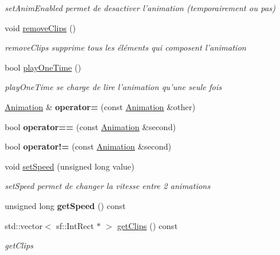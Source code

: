\begin{DoxyCompactItemize}
\begin{DoxyCompactList}\small\item\em set\+Anim\+Enabled permet de desactiver l'animation (temporairement ou pas) \end{DoxyCompactList}\item 
\hypertarget{class_animation_ab9b96707a3a9d6d37a08f6c3a3b6672b}{void \hyperlink{class_animation_ab9b96707a3a9d6d37a08f6c3a3b6672b}{remove\+Clips} ()}\label{class_animation_ab9b96707a3a9d6d37a08f6c3a3b6672b}

\begin{DoxyCompactList}\small\item\em remove\+Clips supprime tous les éléments qui composent l'animation \end{DoxyCompactList}\item 
bool \hyperlink{class_animation_a8cddc695676ba0ed87f35f9e7cbe933a}{play\+One\+Time} ()
\begin{DoxyCompactList}\small\item\em play\+One\+Time se charge de lire l'animation qu'une seule fois \end{DoxyCompactList}\item 
\hypertarget{class_animation_ae4faccf59e6ddc957bc3f6acf65672f7}{\hyperlink{class_animation}{Animation} \& {\bfseries operator=} (const \hyperlink{class_animation}{Animation} \&other)}\label{class_animation_ae4faccf59e6ddc957bc3f6acf65672f7}

\item 
\hypertarget{class_animation_aac64678cc05194bb086b185980f2e45f}{bool {\bfseries operator==} (const \hyperlink{class_animation}{Animation} \&second)}\label{class_animation_aac64678cc05194bb086b185980f2e45f}

\item 
\hypertarget{class_animation_a8adc5a4825eac58390ca8d933f9c57c9}{bool {\bfseries operator!=} (const \hyperlink{class_animation}{Animation} \&second)}\label{class_animation_a8adc5a4825eac58390ca8d933f9c57c9}

\item 
void \hyperlink{class_animation_abce52c50e52ca5d9eba39ab840650c31}{set\+Speed} (unsigned long value)
\begin{DoxyCompactList}\small\item\em set\+Speed permet de changer la vitesse entre 2 animations \end{DoxyCompactList}\item 
\hypertarget{class_animation_ac10342a9268250102aec182f4f29eb5e}{unsigned long {\bfseries get\+Speed} () const }\label{class_animation_ac10342a9268250102aec182f4f29eb5e}

\item 
std\+::vector$<$ sf\+::\+Int\+Rect $\ast$ $>$ \hyperlink{class_animation_a61a4c0512dd9fe244a32ff089027832b}{get\+Clips} () const 
\begin{DoxyCompactList}\small\item\em get\+Clips \end{DoxyCompactList}\end{DoxyCompactItemize}
